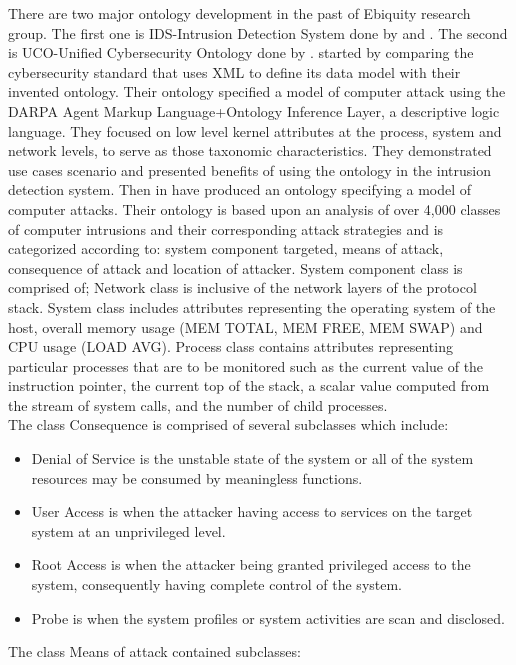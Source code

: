 There are two major ontology development in the past of Ebiquity research group. The first one is IDS-Intrusion Detection System done by \cite{undercoffer2003} and \cite{undercoffer2004}. The second is UCO-Unified Cybersecurity Ontology done by \cite{syed2016uco}. \cite{undercoffer2003} started by comparing the cybersecurity standard that uses XML to define its data model with their invented ontology. Their ontology specified a model of computer attack using the DARPA Agent Markup Language+Ontology Inference Layer, a descriptive logic language. They focused on low level kernel attributes at the process, system and network levels, to serve as those taxonomic characteristics. They demonstrated use cases scenario and presented benefits of using the ontology in the intrusion detection system. Then in \cite{undercoffer2004} have produced an ontology specifying a model of computer attacks. Their ontology is based upon an analysis of over 4,000 classes of computer intrusions and their corresponding attack strategies and is categorized according to: system component targeted, means of attack, consequence of attack and location of attacker. 
System component class is comprised of; 
Network class is inclusive of the network layers of the protocol stack. 
System class includes attributes representing the operating system of the host, overall memory usage (MEM TOTAL, MEM FREE, MEM SWAP) and CPU usage (LOAD AVG).
Process class contains attributes representing particular processes that are to be monitored such as the current value of the instruction pointer, the current top of the stack, a scalar value computed from the stream of system calls, and the number of child processes.\\
 The class Consequence is comprised of several subclasses which include: 
\begin{itemize}
    \item Denial of Service is the unstable state of the system or all of the system resources may be consumed by meaningless functions.
    \item User Access is when the attacker having access to services on the target system at an unprivileged level.
    \item Root Access is when the attacker being granted privileged access to the system, consequently having complete control of the system.
    \item Probe is when the system profiles or system activities are scan and disclosed.  
\end{itemize}
The class Means of attack contained subclasses:
